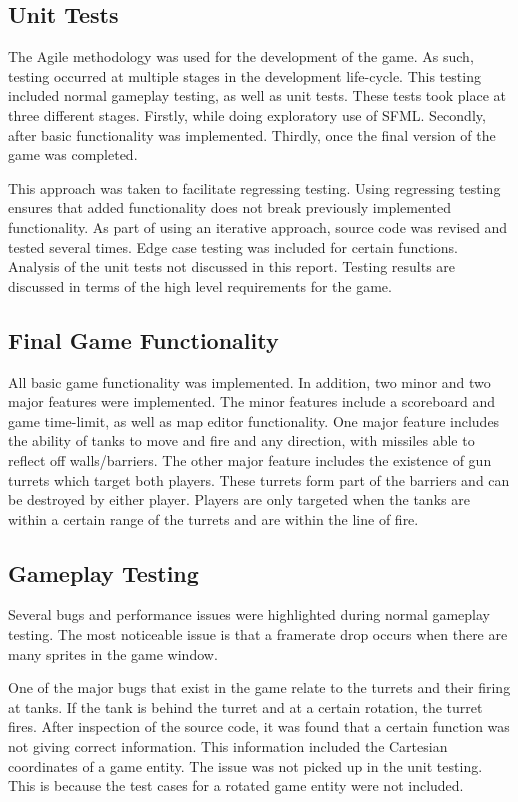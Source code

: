 \documentclass[10pt,twocolumn]{witseiepaper}
\begin{document}
\subsection{Unit Tests}
The Agile methodology was used for the development of the game. As such, testing occurred at multiple stages in the development life-cycle. This testing included normal gameplay testing, as well as unit tests. These tests took place at three different stages. Firstly, while doing exploratory use of SFML. Secondly, after basic functionality was implemented. Thirdly, once the final version of the game was completed.

This approach was taken to facilitate regressing testing. Using regressing testing ensures that added functionality does not break previously implemented functionality. As part of using an iterative approach, source code was revised and tested several times. Edge case testing was included for certain functions. Analysis of the unit tests not discussed in this report. Testing results are discussed in terms of the high level requirements for the game.

\subsection{Final Game Functionality}
All basic game functionality was implemented. In addition, two minor and two major features were implemented. The minor features include a scoreboard and game time-limit, as well as map editor functionality. One major feature includes the ability of tanks to move and fire and any direction, with missiles able to reflect off walls/barriers. The other major feature includes the existence of gun turrets which target both players. These turrets form part of the barriers and can be destroyed by either player. Players are only targeted when the tanks are within a certain range of the turrets and are within the line of fire.

\subsection{Gameplay Testing}
Several bugs and performance issues were highlighted during normal gameplay testing. The most noticeable issue is that a framerate drop occurs when there are many sprites in the game window. 

One of the major bugs that exist in the game relate to the turrets and their firing at tanks. If the tank is behind the turret and at a certain rotation, the turret fires. After inspection of the source code, it was found that a certain function was not giving correct information. This information included the Cartesian coordinates of a game entity. The issue was not picked up in the unit testing. This is because the test cases for a rotated game entity were not included. 
\end{document}

